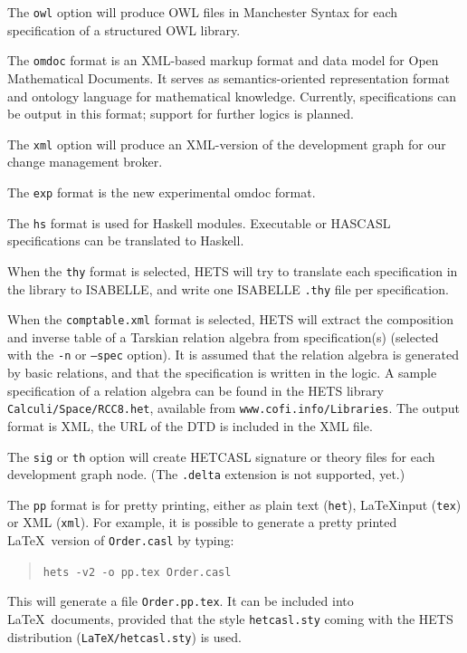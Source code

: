 \documentclass{article}
\newcommand{\normalTEXTSC}[2]{{#1\scriptsize#2}}
\newcommand     {\Hets}{\normalTEXTSC{H}{ETS}\xspace}
\newcommand     {\Isabelle}{\normalTEXTSC{I}{SABELLE}\xspace}
\newcommand     {\HasCASL}{\normalTEXTSC{H}{AS}\normalTEXTSC{C}{ASL}\xspace}
\newcommand{\HetCASL}{\normalTEXTSC{H}{ET}\normalTEXTSC{C}{ASL}\xspace}
\begin{document}
\begin{description}
The \texttt{owl} option \cite{books/sp/Kohlhase06} will produce OWL files in
Manchester Syntax for each specification of a structured OWL library.

The \texttt{omdoc} format \cite{books/sp/Kohlhase06} is an XML-based
markup format and data model for Open Mathematical Documents. It
serves as semantics-oriented representation format and ontology
language for mathematical knowledge. Currently, \CASL specifications
can be output in this format; support for further logics is planned.

The \texttt{xml} option will produce an XML-version of the development graph
for our change management broker.

The \texttt{exp} format is the new experimental omdoc format.

The \texttt{hs} format is used for Haskell modules. Executable \CASL or
\HasCASL specifications can be translated to Haskell.

When the \texttt{thy} format is selected, \Hets will try to translate
each specification in the library to \Isabelle, and write one \Isabelle
\texttt{.thy} file per specification.

When the \texttt{comptable.xml} format is selected, \Hets will extract
the composition and inverse table of a Tarskian relation algebra from
specification(s) (selected with the \texttt{-n} or \texttt{--spec}
option). It is assumed that the relation algebra is
generated by basic relations, and that the specification is written
in the \CASL logic. A sample specification of a relation
algebra can be found in the \Hets library \texttt{Calculi/Space/RCC8.het},
available from \texttt{www.cofi.info/Libraries}.
The output format is XML, the URL of the DTD is included in the
XML file.

The \texttt{sig} or \texttt{th} option will create \HetCASL signature or
theory files for each development graph node. (The \texttt{.delta} extension
is not supported, yet.)

The \texttt{pp} format is for pretty printing, either as plain text
(\texttt{het}), \LaTeX input (\texttt{tex}) or XML (\texttt{xml}).
For example, it is possible to generate a pretty
printed \LaTeX\ version of \texttt{Order.casl} by typing:

\begin{quote}
\texttt{hets -v2 -o pp.tex Order.casl}
\end{quote}

This will generate a file \texttt{Order.pp.tex}. It can be included
into \LaTeX\ documents, provided that the style \texttt{hetcasl.sty}
coming with the \Hets distribution (\texttt{LaTeX/hetcasl.sty}) is used.


\end{description}
\end{document}
